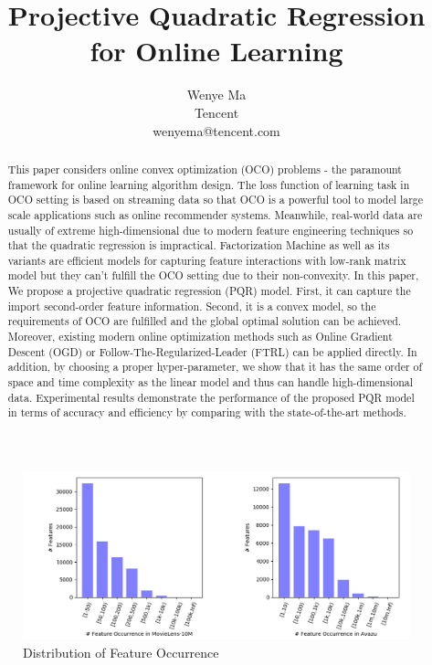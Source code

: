 \documentclass[letterpaper]{article} %
\title{Projective Quadratic Regression for Online Learning}
\author{Wenye Ma\\%
Tencent\\
wenyema@tencent.com
}
\theoremstyle{plain}
\theoremstyle{definition}
\begin{document}
\maketitle

\begin{abstract}
This paper considers online convex optimization (OCO) problems - the paramount framework for online learning algorithm design. The loss function of learning task in OCO setting is based on streaming data so that OCO is a powerful tool to model large scale applications such as online recommender systems. Meanwhile, real-world data are usually of extreme high-dimensional due to modern feature engineering techniques so that the quadratic regression is impractical. Factorization Machine as well as its variants are efficient models for capturing feature interactions with low-rank matrix model but they can't fulfill the OCO setting due to their non-convexity. In this paper, We propose a projective quadratic regression (PQR) model. First, it can capture the import second-order feature information. Second, it is a convex model, so the requirements of OCO are fulfilled and the global optimal solution can be achieved. Moreover, existing modern online optimization methods such as Online Gradient Descent (OGD) or Follow-The-Regularized-Leader (FTRL) can be applied directly. In addition, by choosing a proper hyper-parameter, we show that it has the same order of space and time complexity as the linear model and thus can handle high-dimensional data. Experimental results demonstrate the performance of the proposed PQR model in terms of accuracy and efficiency by comparing with the state-of-the-art methods.
\end{abstract}


\begin{figure}
\includegraphics[width=1\textwidth]{AAAI-MaW-2016-FeatureCounts.png}
\caption{Distribution of Feature Occurrence}
\label{fig.feature_counts}
\end{figure}
\end{document}
